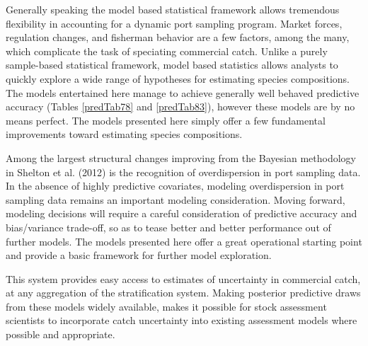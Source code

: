 \documentclass[12pt]{article}
\begin{document}
Generally speaking the model based statistical framework allows tremendous 
flexibility in accounting for a dynamic port sampling program. Market 
forces, regulation changes, and fisherman behavior are a few factors, among 
the many, which complicate the task of speciating commercial catch. 
Unlike a purely sample-based statistical framework, model based statistics 
allows analysts to quickly explore a wide range of hypotheses for 
estimating species compositions. The models entertained here manage to 
achieve generally well behaved predictive accuracy (Tables \ref{predTab78} 
and \ref{predTab83}), however these models are by no means perfect. The 
models presented here simply offer a few fundamental improvements toward 
estimating species compositions.

Among the largest structural changes improving from the Bayesian
methodology in Shelton et al. (2012) is the recognition of
overdispersion in port sampling data. In the absence of highly
predictive covariates, modeling overdispersion in port sampling data
remains an important modeling consideration. Moving forward, modeling
decisions will require a careful consideration of predictive accuracy
and bias/variance trade-off, so as to tease better and better
performance out of further models. The models presented here offer a
great operational starting point and provide a basic framework for
further model exploration.

This system provides easy access to estimates of uncertainty in commercial 
catch, at any aggregation of the stratification system. Making posterior 
predictive draws from these models widely available, makes it possible for 
stock assessment scientists to incorporate catch uncertainty into existing 
assessment models where possible and appropriate. 

%
\end{document}
